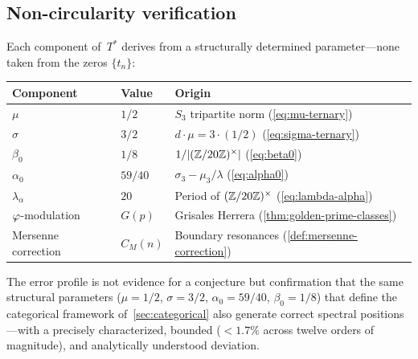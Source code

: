 \subsection{Non-circularity verification}\label{ssec:non-circularity}

Each component of~$T^*$ derives from a structurally determined
parameter---none taken from the zeros $\{t_n\}$:

\begin{center}
\begin{tabular}{lll}
\toprule
Component & Value & Origin \\
\midrule
$\mu$   & $1/2$   & $S_3$ tripartite norm (\cref{eq:mu-ternary}) \\
$\sigma$ & $3/2$  & $d\cdot\mu = 3\cdot(1/2)$ (\cref{eq:sigma-ternary}) \\
$\beta_0$ & $1/8$ & $1/|(\mathbb{Z}/20\mathbb{Z})^\times|$ (\cref{eq:beta0}) \\
$\alpha_0$ & $59/40$ & $\sigma_3-\mu_3/\lambda$ (\cref{eq:alpha0}) \\
$\lambda_\alpha$ & $20$ & Period of $(\mathbb{Z}/20\mathbb{Z})^\times$ (\cref{eq:lambda-alpha}) \\
$\varphi$-modulation & $G(p)$ & Grisales Herrera (\cref{thm:golden-prime-classes}) \\
Mersenne correction & $C_M(n)$ & Boundary resonances (\cref{def:mersenne-correction}) \\
\bottomrule
\end{tabular}
\end{center}

\begin{Remark}
The error profile is not evidence for a conjecture but
confirmation that the same structural parameters
($\mu = 1/2$, $\sigma = 3/2$, $\alpha_0 = 59/40$,
$\beta_0 = 1/8$) that define the categorical framework
of~\cref{sec:categorical} also generate correct spectral
positions---with a precisely characterized, bounded
($<1.7\%$ across twelve orders of magnitude), and
analytically understood deviation.
\end{Remark}
